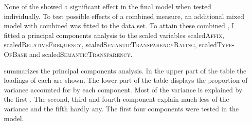 None of the  showed a significant effect in the final model when tested individually. To test possible effects of a combined  measure, an additional mixed model with combined  was fitted to the data set.  
To attain these combined , I fitted a principal components analysis to the scaled variables scaled\textsc{Affix}, scaled\textsc{RelativeFrequency}, scaled\textsc{SemanticTransparencyRating}, scaled\textsc{Type-OfBase} and scaled\textsc{SemanticTransparency}.





 summarizes the principal components analysis. In the upper part of the table the loadings of each  are shown. The lower part of the table displays the proportion of variance accounted for by each component. 
Most of the variance is explained by the first . The second, third and fourth component explain much less of the variance and the fifth hardly any.  The first four components were tested in the model. 


\begin{table}
	\caption{ Summary of principal components}
	\label{tbl: summary PC im exp}

	
	
\end{table}



